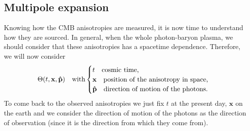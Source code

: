 \subsection{Multipole expansion}\label{sec:MultipoleExpansion}
Knowing how the CMB anisotropies are measured, it is now time to understand how they are sourced. In general, when the whole photon-baryon plasma, we should consider that these anisotropies has a spacetime dependence. Therefore, we will now consider
\begin{equation}
    \Theta({t,\mathbf x,\mathbf{\hat{p}}})\quad\text{with}
    \begin{cases}
        t\quad\text{cosmic time,}\\
        \mathbf x\quad\text{position of the anisotropy in space,}\\
        \mathbf{\hat{p}}\quad\text{direction of motion of the photons}.
    \end{cases}
\end{equation}
To come back to the observed anisotropies we just fix $t$ at the present day, $\mathbf x$ on the earth and we consider the direction of motion of the photons as the direction of observation (since it is the direction from which they come from).

